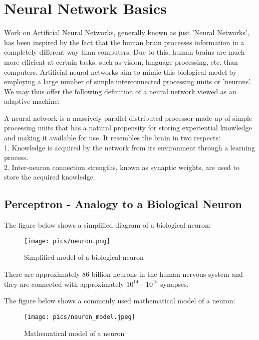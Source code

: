 \documentclass[twoside]{article}
\begin{document}
\section{Neural Network Basics}
Work on Artificial Neural Networks, generally known as just 'Neural Networks', has been inspired by the fact that the human brain processes information in a completely different way than computers. Due to this, human brains are much more efficient at certain tasks, such as vision, language processing, etc. than computers. Artificial neural networks aim to mimic this biological model by employing a large number of simple interconnected processing units or 'neurons'.  We may thus offer the following definition of a neural network viewed as an adaptive machine\cite{haykin}:

A neural network is a massively parallel distributed processor made up of simple processing units that has a natural propensity for storing experiential knowledge and making it available for use. It resembles the brain in two respects:\\
1. Knowledge is acquired by the network from its environment through a learning process.\\
2. Inter-neuron connection strengths, known as synaptic weights, are used to store the acquired knowledge.

\subsection{Perceptron - Analogy to a Biological Neuron}
The figure below shows a simplified diagram of a biological neuron:

\begin{figure}[!htb]
\centering
\texttt{[image: pics/neuron.png]}
\caption{Simplified model of a biological neuron\cite{cs231n-website}}
\label{fig:bio-neuron}
\end{figure}

There are approximately 86 billion neurons in the human nervous system and they are connected with approximately $10^14$ - $10^15$ synapses\cite{cs231n-website}.

The figure below shows a commonly used mathematical model of a neuron:

\begin{figure}[!htb]
\centering
\texttt{[image: pics/neuron\_model.jpeg]}
\caption{Mathematical model of a neuron\cite{cs231n-website}}
\label{fig:neuron_model}
\end{figure}
\end{document}
